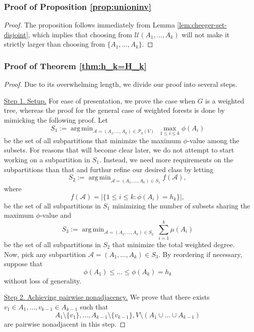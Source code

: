 \documentclass[12pt, reqno]{article}
\DeclareMathOperator*{\argmin}{arg\,min}
\begin{document}
\subsubsection{Proof of Proposition \ref{prop:unioninv}}
\begin{proof}
The proposition follows immediately from Lemma \ref{lem:cheeger-set-disjoint}, which implies that choosing from $\mathcal U(A_1,\dots,A_k)$ will not make it strictly larger than choosing from $\{A_1,\dots,A_k\}$.
\end{proof}

\subsubsection{Proof of Theorem \ref{thm:h_k=H_k}}
\begin{proof}
Due to its overwhelming length, we divide our proof into several steps.

\vspace{0.3cm}

\noindent\underline{Step 1. Setup.}
\newline\noindent For ease of presentation, we prove the case when $G$ is a weighted tree, whereas the proof for the general case of weighted forests is done by mimicking the following proof. Let \[S_1:=\argmin_{\mathcal A=(A_1,\dots,A_k)\in\mathcal{P}_k(V)}~\max_{1\le i\le k}\phi(A_i)\] be the set of all subpartitions that minimize the maximum $\phi$-value among the subsets. For reasons that will become clear later, we do not attempt to start working on a subpartition in $S_1$. Instead, we need more requirements on the subpartitions than that and furthur refine our desired class by letting \[S_2:=\argmin_{\mathcal A=(A_1,\dots,A_k)\in S_1}f(\mathcal A),\] where \[f(\mathcal A)=|\{1\le i\le k\colon\phi(A_i)=h_k\}|,\] be the set of all subpartitions in $S_1$ minimizing the number of subsets sharing the maximum $\phi$-value and \[S_3:=\argmin_{\mathcal A=(A_1,\dots,A_k)\in S_2}~\sum_{i=1}^k\mu(A_i)\] be the set of all subpartitions in $S_2$ that minimize the total weighted degree. Now, pick any subpartition $\mathcal A=(A_1,\dots,A_k)\in S_3$. By reordering if necessary, suppose that \[\phi(A_1)\le\dots\le\phi(A_k)=h_k\] without loss of generality.

\vspace{0.3cm}

\noindent\underline{Step 2. Achieving pairwise nonadjacency.}
\newline\noindent We prove that there exists $v_1\in A_1,\dots,v_{k-1}\in A_{k-1}$ such that \[A_1\setminus\{v_1\},\dots,A_{k-1}\setminus\{v_{k-1}\},V\setminus(A_1\cup\dots\cup A_{k-1})\] are pairwise nonadjacent in this step.


\end{proof}
\end{document}
